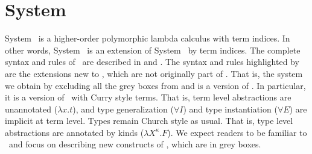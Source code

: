 \section{System \Fi}
\label{sec:Fi}
System \Fi\ is a higher-order polymorphic lambda calculus with term indices.
In other words, System \Fi\ is an extension of System \Fw\ by term indices.
The complete syntax and rules of \Fi\ are described in  and .
The syntax and rules highlighted by  are the extensions
new to \Fi, which are not originally part of \Fw. That is, the system we obtain
by excluding all the grey boxes from  and  is a version of
\Fw. In particular, it is a version of \Fw\ with Curry style terms. That is,
term level abstractions are unannotated ($\lambda x.t$), and type generalization
($\forall I$) and type instantiation ($\forall E$) are implicit at term level.
Types remain Church style as usual. That is, type level abstractions are
annotated by kinds ($\lambda X^\kappa.F$). We expect readers to be familiar to
\Fw\ and focus on describing new constructs of \Fi, which are in grey boxes.

